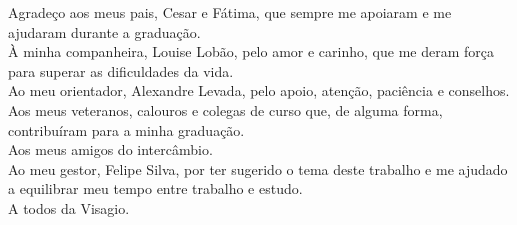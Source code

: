 \begin{agradecimentos}

    Agradeço aos meus pais, Cesar e Fátima, que sempre me apoiaram e me ajudaram durante a graduação.\\
    À minha companheira, Louise Lobão, pelo amor e carinho, que me deram força para superar as dificuldades da vida.\\
    Ao meu orientador, Alexandre Levada, pelo apoio, atenção, paciência e conselhos.\\
    Aos meus veteranos, calouros e colegas de curso que, de alguma forma, contribuíram para a minha graduação.\\
    Aos meus amigos do intercâmbio.\\
    Ao meu gestor, Felipe Silva, por ter sugerido o tema deste trabalho e me ajudado a equilibrar meu tempo entre trabalho e estudo.\\
    A todos da Visagio.\\

\end{agradecimentos}

